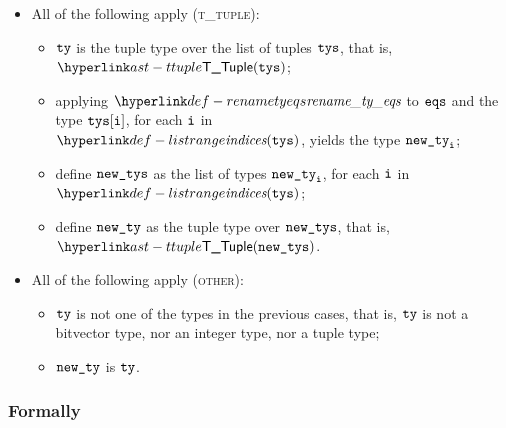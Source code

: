 \begin{itemize}
  \item All of the following apply (\textsc{t\_tuple}):
  \begin{itemize}
    \item $\texttt{ty}$ is the tuple type over the list of tuples $\texttt{tys}$, that is, $\TTuple(\tys)$;
    \item applying $\renametyeqs$ to $\texttt{eqs}$ and the type $\texttt{tys}[\texttt{i}]$, for each $\texttt{i}$ in \\
          $\listrange(\tys)$, yields the type $\texttt{new\_ty}_{\texttt{i}}$;
    \item define $\texttt{new\_tys}$ as the list of types $\texttt{new\_ty}_{\texttt{i}}$, for each $\texttt{i}$ in $\listrange(\tys)$;
    \item define $\texttt{new\_ty}$ as the tuple type over $\texttt{new\_tys}$, that is, $\TTuple(\newtys)$.
  \end{itemize}

  \item All of the following apply (\textsc{other}):
  \begin{itemize}
    \item $\texttt{ty}$ is not one of the types in the previous cases,
          that is, $\texttt{ty}$ is not a bitvector type, nor an integer type, nor a tuple type;
    \item $\texttt{new\_ty}$ is $\texttt{ty}$.
  \end{itemize}
\end{itemize}

\subsubsection{Formally}


